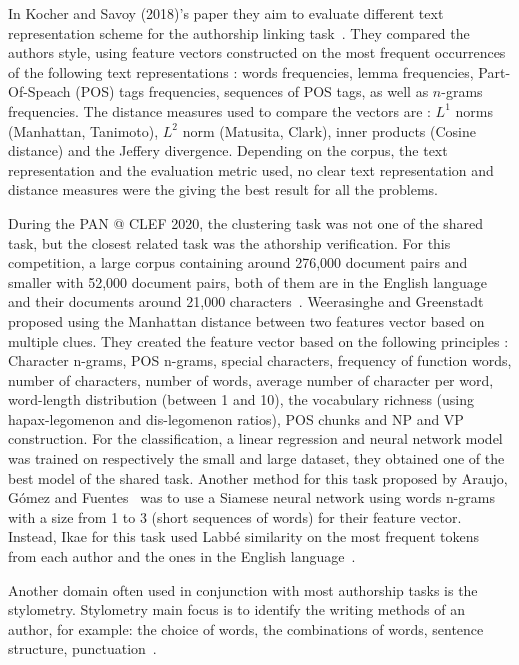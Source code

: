 In Kocher and Savoy (2018)'s paper they aim to evaluate different text representation scheme for the authorship linking task~\cite{kocher_linking}.
They compared the authors style, using feature vectors constructed on the most frequent occurrences of the following text representations : words frequencies, lemma frequencies, Part-Of-Speach (POS) tags frequencies, sequences of POS tags, as well as $n$-grams frequencies.
The distance measures used to compare the vectors are : $L^1$ norms (Manhattan, Tanimoto), $L^2$ norm (Matusita, Clark), inner products (Cosine distance) and the Jeffery divergence.
Depending on the corpus, the text representation and the evaluation metric used, no clear text representation and distance measures were the giving the best result for all the problems.

During the PAN @ CLEF 2020, the clustering task was not one of the shared task, but the closest related task was the athorship verification.
For this competition, a large corpus containing around 276,000 document pairs and smaller with 52,000 document pairs, both of them are in the English language and their documents around 21,000 characters~\cite{overview_pan20}.
Weerasinghe and Greenstadt~\cite{feature_vector_pan20} proposed using the Manhattan distance between two features vector based on multiple clues.
They created the feature vector based on the following principles : Character n-grams, POS n-grams, special characters, frequency of function words, number of characters, number of words, average number of character per word, word-length distribution (between 1 and 10), the vocabulary richness (using hapax-legomenon and dis-legomenon ratios), POS chunks and NP and VP construction.
For the classification, a linear regression and neural network model was trained on respectively the small and large dataset, they obtained one of the best  model of the shared task.
Another method for this task proposed by Araujo, Gómez and Fuentes~\cite{siamese_network_pan20} was to use a Siamese neural network using words n-grams with a size from 1 to 3 (short sequences of words) for their feature vector.
Instead, Ikae for this task used Labbé similarity on the most frequent tokens from each author and the ones in the English language~\cite{unine_pan20_verif}.

Another domain often used in conjunction with most authorship tasks is the stylometry.
Stylometry main focus is to identify the writing methods of an author, for example: the choice of words, the combinations of words, sentence structure, punctuation~\cite{savoy_stylo}.
